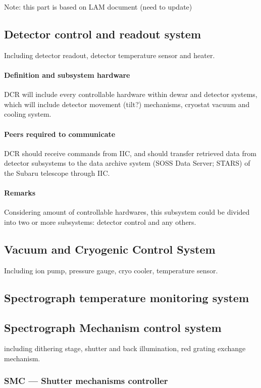 \documentclass[a4paper,notitlepage]{article}
\begin{document}
Note: this part is based on LAM document (need to update)

\subsection{Detector control and readout system}

Including detector readout, detector temperature sensor and heater.

\paragraph{Definition and subsystem hardware}
DCR will include every controllable hardware within dewar and detector systems, 
which will include detector movement (tilt?) mechanisms, cryostat vacuum and 
cooling system. 
\paragraph{Peers required to communicate}
DCR should receive commands from IIC, and should transfer retrieved data from 
detector subsystems to the data archive system (SOSS Data Server; STARS) of 
the Subaru telescope through IIC. 
\paragraph{Remarks}
Considering amount of controllable hardwares, this subsystem could be divided 
into two or more subsystems: detector control and any others. 


\subsection{Vacuum and Cryogenic Control System}

Including ion pump, pressure gauge, cryo cooler, temperature sensor.

\subsection{Spectrograph temperature monitoring system}


\subsection{Spectrograph Mechanism control system}

including dithering stage, shutter and back illumination, red grating 
exchange mechanism.

\subsubsection{SMC --- Shutter mechanisms controller}
\end{document}
